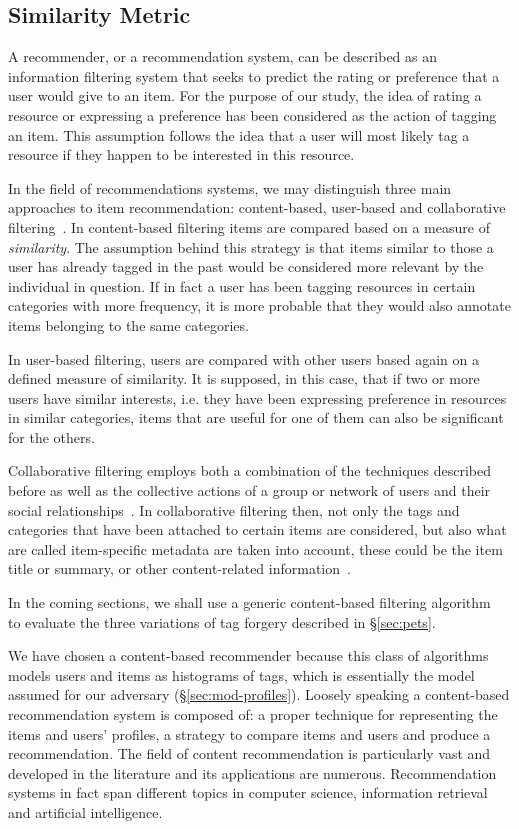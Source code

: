 \subsection{Similarity Metric}
\noindent
A recommender, or a recommendation system, can be described as an information filtering system that seeks to predict the rating or preference that a user would give to an item. For the purpose of our study, the idea of rating a resource or expressing a preference has been considered as the action of tagging an item. This assumption follows the idea that a user will most likely tag a resource if they happen to be interested in this resource.

In the field of recommendations systems, we may distinguish three main approaches to item recommendation: content-based, user-based and collaborative filtering~\cite{a25}.
In content-based filtering items are compared based on a measure of \emph{similarity}. The assumption behind this strategy is that items similar to those a user has already tagged in the past would be considered more relevant by the individual in question. If in fact a user has been tagging resources in certain categories with more frequency, it is more probable that they would also annotate items belonging to the same categories.

In user-based filtering, users are compared with other users based again on a defined measure of similarity. It is supposed, in this case, that if two or more users have similar interests, i.e. they have been expressing preference in resources in similar categories, items that are useful for one of them can also be significant for the others.

Collaborative filtering employs both a combination of the techniques described before as well as the collective actions of a group or network of users and their social relationships~\cite{collfilt}. In collaborative filtering then, not only the tags and categories that have been attached to certain items are considered, but also what are called item-specific metadata are taken into account, these could be the item title or summary, or other content-related information~\cite{a04}.

In the coming sections, we shall use a generic content-based filtering algorithm~\cite{Lops11B} to evaluate the three variations of tag forgery described in \S \ref{sec:pets}. 

We have chosen a content-based recommender because this class of algorithms models users and items as histograms of tags, which is essentially the model assumed for our adversary (\S  \ref{sec:mod-profiles}). Loosely speaking a content-based recommendation system is composed of: a proper technique for representing the items and users' profiles, a strategy to compare items and users and produce a recommendation. The field of content recommendation is particularly vast and developed in the literature and its applications are numerous. Recommendation systems in fact span different topics in computer science, information retrieval and artificial intelligence. 

